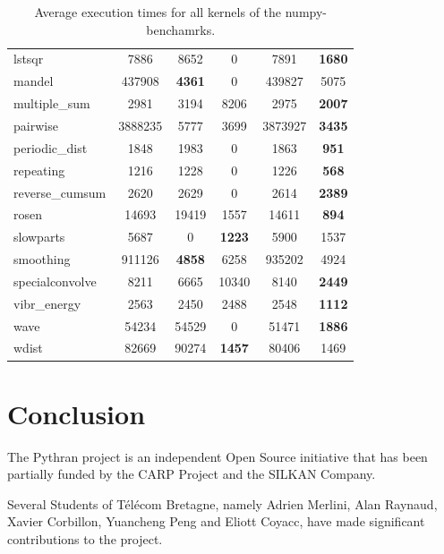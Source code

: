 \documentclass[10pt, preprint]{sigplanconf}
\begin{document}
\begin{table}
{\begin{tabular}{|l||c|c|c|c|c|}
                    lstsqr &    7886 &          8652 &             0 &          7891 & \textbf{1680} \\
                    mandel &  437908 & \textbf{4361} &             0 &        439827 &          5075 \\
             multiple\_sum &    2981 &          3194 &          8206 &          2975 & \textbf{2007} \\
                  pairwise & 3888235 &          5777 &          3699 &       3873927 & \textbf{3435} \\
            periodic\_dist &    1848 &          1983 &             0 &          1863 &  \textbf{951} \\
                 repeating &    1216 &          1228 &             0 &          1226 &  \textbf{568} \\
           reverse\_cumsum &    2620 &          2629 &             0 &          2614 & \textbf{2389} \\
                     rosen &   14693 &         19419 &          1557 &         14611 &  \textbf{894} \\
                 slowparts &    5687 &             0 & \textbf{1223} &          5900 &          1537 \\
                 smoothing &  911126 & \textbf{4858} &          6258 &        935202 &          4924 \\
           specialconvolve &    8211 &          6665 &         10340 &          8140 & \textbf{2449} \\
              vibr\_energy &    2563 &          2450 &          2488 &          2548 & \textbf{1112} \\
                      wave &   54234 &         54529 &             0 &         51471 & \textbf{1886} \\
                     wdist &   82669 &         90274 & \textbf{1457} &         80406 &          1469 \\
\hline
\end{tabular}
}
\caption{Average execution times for all kernels of the numpy-benchamrks.}
\end{table}

\section*{Conclusion}

\acks

The Pythran project is an independent Open Source initiative that has been
partially funded by the CARP Project and the SILKAN Company.

Several Students of Télécom Bretagne, namely Adrien Merlini, Alan Raynaud,
Xavier Corbillon, Yuancheng Peng and Eliott Coyacc, have made significant
contributions to the project.




\end{document}
